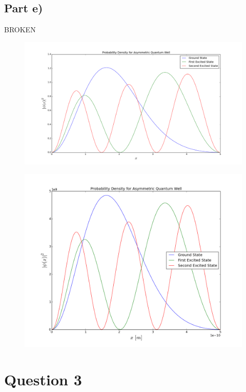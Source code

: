 \documentclass[a4paper,12pt]{article}
\begin{document}
\subsection{Part e)}

BROKEN

\begin{figure}[H]
\centering
\includegraphics[width = \linewidth]{lab4q2ei.png}
\caption{}
\label{fig:q2ei}
\end{figure}

\begin{figure}[H]
\centering
\includegraphics[width = \linewidth]{lab4q2ef.png}
\caption{}
\label{fig:q2ei}
\end{figure}

\section{Question 3}
\end{document}

